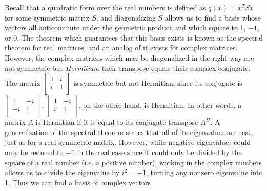 \documentclass{article}
\begin{document}
Recall that a quadratic form over the real numbers
is defined as $q(x) = x^TSx$ for some symmetric matrix $S$,
and diagonalizing $S$ allows us to find a basis
whose vectors all anticommute under the geometric product
and which square to 1, $-1$, or 0.
The theorem which guarantees that this basis exists
is known as the spectral theorem for real matrices,
and an analog of it exists for complex matrices.
However, the complex matrices which may be diagonalized in the right way
are not symmetric but \textit{Hermitian}:
their transpose equals their complex conjugate.
The matrix
$\begin{bmatrix}
  1 & i \\
  i & 1 \\
\end{bmatrix}$
is symmetric but not Hermitian,
since its conjugate is
$\begin{bmatrix}
  1 & -i \\
  -i & 1 \\
\end{bmatrix}$.
$\begin{bmatrix}
  1 & -i \\
  i & 1 \\
\end{bmatrix}$,
on the other hand, is Hermitian.
In other words, a matrix $A$ is Hermitian
if it is equal to its conjugate transpose $A^H$.
A generalization of the spectral theorem states
that all of its eigenvalues are real,
just as for a real symmetric matrix.
However, while negative eigenvalues could only be reduced to $-1$ in the real case
since it could only be divided by the square of a real number (i.e. a positive number),
working in the complex numbers allows us to divide the eigenvalue by $i^2=-1$,
turning any nonzero eigenvalue into 1.
Thus we can find a basis of complex vectors
\end{document}
